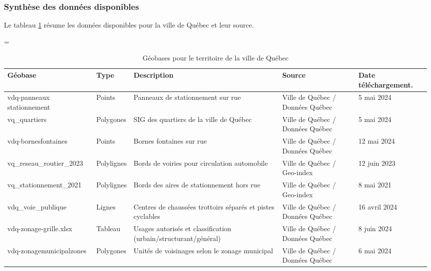     \subsubsection{Synthèse des données disponibles}
      Le tableau \ref{tab:donnees_disponibles_Québec} résume les données disponibles pour la ville de Québec et leur source.
      \begin{landscape}
        \LTcapwidth=\textwidth
      \begin{longtable}[h!]{p{.2 \linewidth} p{.1 \linewidth} p{.3 \linewidth} p{.15\linewidth} p{.125\linewidth} }
        
        
        \hline
        Géobase & Type & Description  & Source & Date téléchargement.\\ 
        \hline
        \hline
        \endhead
        \hline
        \endfoot
        \hline
        \caption{Géobases pour le territoire de la ville de Québec}
        \label{tab:donnees_disponibles_Québec}
        \endlastfoot
        vdq-panneaux stationnement    & Points        & Panneaux de stationnement sur rue          & Ville de Québec / Données Québec  & 5 mai 2024 \\
        \hline
        vq\_quartiers & Polygones & SIG des quartiers de la ville de Québec & Ville de Québec / Données Québec & 5 mai 2024 \\
        \hline
        vdq-bornesfontaines          & Points        & Bornes fontaines sur rue                   & Ville de Québec / Données Québec & 12 mai 2024 \\
        \hline
        vq\_reseau\_routier\_2023 & Polylignes    & Bords de voiries pour circulation automobile  & Ville de Québec / Geo-index  & 12 juin 2023\\ 
        \hline
        vq\_stationnement\_2021  & Polylignes    & Bords des aires de stationnement hors rue & Ville de Québec / Geo-index & 8 mai 2021\\
        \hline
        vdq\_voie\_publique            & Lignes        & Centres de chaussées trottoirs séparés et pistes cyclables & Ville de Québec / Données Québec & 16 avril 2024 \\
        \hline
        vdq-zonage-grille.xlsx          & Tableau        & Usages autorisés et classification (urbain/structurant/général) & Ville de Québec / Données Québec & 8 juin 2024 \\
        \hline
        vdq-zonagemunicipalzones          & Polygones        & Unités de voisinages selon le zonage municipal & Ville de Québec / Données Québec & 6 mai 2024 \\

\end{longtable}
\end{landscape}
